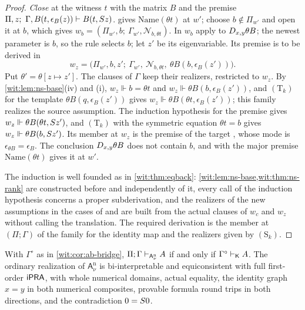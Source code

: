 \begin{proof}
\emph{Close} at the witness $t$ with the matrix $B$ and the premise
$\Pi,z;\ \Gamma,B(t,\epsilon_B(z))\proves B(t,\Suc z)$.  
gives $\mathrm{Name}(\theta t)$ at $w'$; choose $b\notin\Pi_{w'}$ and open it
at $b$, which gives $w_b=(\Pi_{w'},b;\ \Gamma_{w'},\mathcal N_{b,\theta t})$.
In $w_b$ apply  to $D_{x,y}\theta B$; the newest parameter is
$b$, so the rule selects $b$; let $z'$ be its eigenvariable.  Its premise is
to be derived in
\[
 w_z=\bigl(\Pi_{w'},b,z';\ \Gamma_{w'},\ \mathcal N_{b,\theta t},\
 \theta B(b,\epsilon_B(z'))\bigr).
\]
Put $\theta'=\theta[z\mapsto z']$.  The clauses of $\Gamma$ keep their
realizers, restricted to $w_z$.  By \cref{wit:lem:ns-base}(iv) and (i),
$w_z\Vdash b=\theta t$ and $w_z\Vdash\theta B(b,\epsilon_B(z'))$, and
$(\mathrm T_k)$ for the template $\theta B(q,\epsilon_B(z'))$ gives
$w_z\Vdash\theta B(\theta t,\epsilon_B(z'))$; this family realizes the source
assumption.  The induction hypothesis for the premise gives
$w_z\Vdash\theta B(\theta t,S z')$, and $(\mathrm T_k)$ with the
symmetric equation $\theta t=b$ gives $w_z\Vdash\theta B(b,S z')$.  Its
member at $w_z$ is the premise of the target \rulename{Close}, whose mode
is $\epsilon_{\theta B}=\epsilon_B$.  The conclusion $D_{x,y}\theta B$ does
not contain $b$, and \rulename{Open} with the major premise
$\mathrm{Name}(\theta t)$ gives it at $w'$.

The induction is well founded as in \cref{wit:thm:eqback}:
\cref{wit:lem:ns-base,wit:thm:ns-rank} are constructed before and
independently of it, every call of the induction hypothesis concerns a
proper subderivation, and the realizers of the new assumptions in the cases
of \rulename{Alias} and \rulename{Close} are built from the actual clauses of
$w_c$ and $w_z$ without calling the translation.  The required derivation is
the member at $(\Pi;\Gamma)$ of the family for the identity map and the
realizers given by $(\mathrm S_k)$.
\end{proof}

\begin{corollary}
\label{wit:cor:ns-bridge}
With $\Gamma^{\circ}$ as in \cref{wit:cor:ab-bridge},
$\Pi;\Gamma\vdash_{\mathsf{A}^{\mathrm n}_{\nu}}A$ if and only if
$\Gamma^{\circ}\vdash_{\mathsf{K}}A$.  The ordinary realization of
$\mathsf{A}^{\mathrm n}_{\nu}$ is bi-interpretable and equiconsistent with
full first-order $\mathsf{iPRA}$, with whole numerical domains, actual equality, the
identity graph $x=y$ in both numerical composites, provable formula round
trips in both directions, and the contradiction $0=S 0$.
\end{corollary}

